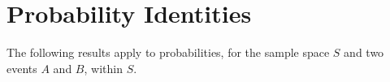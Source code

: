             \section{ Probability Identities}
            \nopagebreak
            \label{m39377*id113940}The following results apply to probabilities, for the sample space
\begin{math}S\end{math} and two events \begin{math}A\end{math} and \begin{math}B\end{math}, within \begin{math}S\end{math}.\par 
      \label{m39377*uid57}\nopagebreak\noindent{}
    
